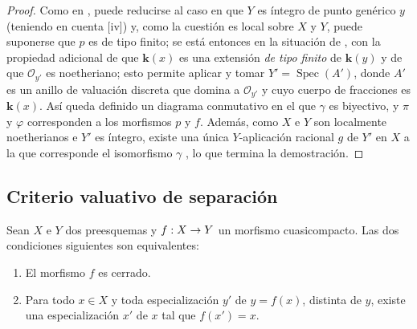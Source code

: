 \documentclass[oneside,10pt]{amsart}
\makeatletter
\newcommand{\ega@arrow}[2]{\mathchoice{#1}{#2}{#2}{#2}}
\renewcommand{\to}{\ega@arrow{\longrightarrow}{\rightarrow}}
\let\EGAOriginalLabel\label
\renewcommand{\label}[1]{\phantomsection\EGAOriginalLabel{#1}}
\makeatother
\begin{document}
\begin{proof}
Como en , puede reducirse al caso en que $Y$ es íntegro de punto genérico $y$ (teniendo en cuenta [iv]) y, como la cuestión es local sobre $X$ y $Y$, puede suponerse que $p$ es de tipo finito;
se está entonces en la situación de , con la propiedad adicional de que $\boldsymbol{k}(x)$ es una extensión \emph{de tipo finito} de $\boldsymbol{k}(y)$  y de que $\mathcal{O}_{y'}$ es noetheriano;
esto permite aplicar  y tomar $Y'=\operatorname{Spec}(A')$, donde $A'$ es un anillo de valuación discreta que domina a $\mathcal{O}_{y'}$ y cuyo cuerpo de fracciones es $\boldsymbol{k}(x)$.
Así queda definido un diagrama conmutativo  en el que $\gamma$ es biyectivo, y $\pi$ y $\varphi$ corresponden a los morfismos $p$ y $f$.
Además, como $X$ e $Y$ son localmente noetherianos  e $Y'$ es íntegro, existe una única $Y$-aplicación racional $g$ de $Y'$ en $X$ a la que corresponde el isomorfismo $\gamma$ , lo que termina la demostración.
\end{proof}


\subsection{Criterio valuativo de separación}
\label{subsection:II.7.2-fr}

\begin{proposition}[7.2.1]
\label{II.7.2.1-fr}
Sean $X$ e $Y$ dos preesquemas y $f:X\to Y$ un morfismo cuasicompacto.
Las dos condiciones siguientes son equivalentes:
\begin{enumerate}
  \item[\rm{(a)}] El morfismo $f$ es cerrado.
  \item[\rm{(b)}] Para todo $x\in X$ y toda especialización $y'$ de $y=f(x)$, distinta de $y$, existe una especialización $x'$ de $x$ tal que $f(x')=x$.
\end{enumerate}
\end{proposition}
\end{document}
